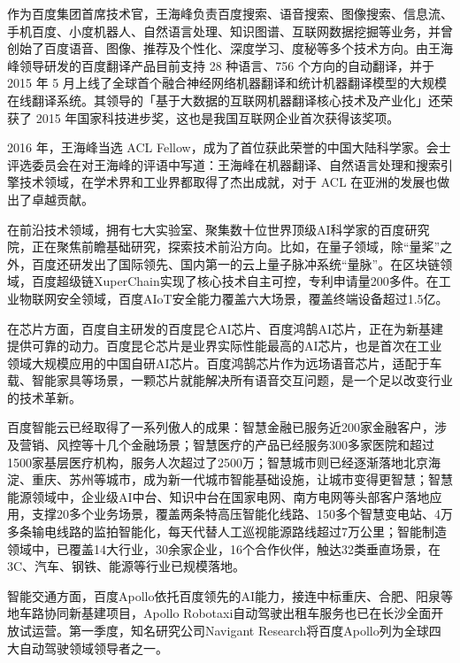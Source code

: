 \documentclass[letterpaper,11pt,english]{sphinxmanual}
\begin{document}
作为百度集团首席技术官，王海峰负责百度搜索、语音搜索、图像搜索、信息流、手机百度、小度机器人、自然语言处理、知识图谱、互联网数据挖掘等业务，并曾创始了百度语音、图像、推荐及个性化、深度学习、度秘等多个技术方向。由王海峰领导研发的百度翻译产品目前支持
28 种语言、756 个方向的自动翻译，并于 2015 年 5
月上线了全球首个融合神经网络机器翻译和统计机器翻译模型的大规模在线翻译系统。其领导的「基于大数据的互联网机器翻译核心技术及产业化」还荣获了
2015 年国家科技进步奖，这也是我国互联网企业首次获得该奖项。

2016 年，王海峰当选 ACL
Fellow，成为了首位获此荣誉的中国大陆科学家。会士评选委员会在对王海峰的评语中写道：王海峰在机器翻译、自然语言处理和搜索引擎技术领域，在学术界和工业界都取得了杰出成就，对于
ACL 在亚洲的发展也做出了卓越贡献。

在前沿技术领域，拥有七大实验室、聚集数十位世界顶级AI科学家的百度研究院，正在聚焦前瞻基础研究，探索技术前沿方向。比如，在量子领域，除“量桨”之外，百度还研发出了国际领先、国内第一的云上量子脉冲系统“量脉”。在区块链领域，百度超级链XuperChain实现了核心技术自主可控，专利申请量200多件。在工业物联网安全领域，百度AIoT安全能力覆盖六大场景，覆盖终端设备超过1.5亿。

在芯片方面，百度自主研发的百度昆仑AI芯片、百度鸿鹄AI芯片，正在为新基建提供可靠的动力。百度昆仑芯片是业界实际性能最高的AI芯片，也是首次在工业领域大规模应用的中国自研AI芯片。百度鸿鹄芯片作为远场语音芯片，适配于车载、智能家具等场景，一颗芯片就能解决所有语音交互问题，是一个足以改变行业的技术革新。

百度智能云已经取得了一系列傲人的成果：智慧金融已服务近200家金融客户，涉及营销、风控等十几个金融场景；智慧医疗的产品已经服务300多家医院和超过1500家基层医疗机构，服务人次超过了2500万；智慧城市则已经逐渐落地北京海淀、重庆、苏州等城市，成为新一代城市智能基础设施，让城市变得更智慧；智慧能源领域中，企业级AI中台、知识中台在国家电网、南方电网等头部客户落地应用，支撑20多个业务场景，覆盖两条特高压智能化线路、150多个智慧变电站、4万多条输电线路的监拍智能化，每天代替人工巡视能源路线超过7万公里；智能制造领域中，已覆盖14大行业，30余家企业，16个合作伙伴，触达32类垂直场景，在3C、汽车、钢铁、能源等行业已规模落地。

智能交通方面，百度Apollo依托百度领先的AI能力，接连中标重庆、合肥、阳泉等地车路协同新基建项目，Apollo
Robotaxi自动驾驶出租车服务也已在长沙全面开放试运营。第一季度，知名研究公司Navigant
Research将百度Apollo列为全球四大自动驾驶领域领导者之一。
%
\begin{footnote}[659]\sphinxAtStartFootnote
{}
%
\end{footnote}
\end{document}
